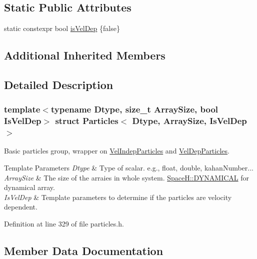 \subsection*{Static Public Attributes}
\begin{DoxyCompactItemize}
\item 
static constexpr bool \mbox{\hyperlink{struct_particles_a2a5da328ea157f7b1c4eddb74eef2e09}{is\+Vel\+Dep}} \{false\}
\end{DoxyCompactItemize}
\subsection*{Additional Inherited Members}


\subsection{Detailed Description}
\subsubsection*{template$<$typename Dtype, size\+\_\+t Array\+Size, bool Is\+Vel\+Dep$>$\newline
struct Particles$<$ Dtype, Array\+Size, Is\+Vel\+Dep $>$}

Basic particles group, wrapper on \mbox{\hyperlink{class_vel_indep_particles}{Vel\+Indep\+Particles}} and \mbox{\hyperlink{class_vel_dep_particles}{Vel\+Dep\+Particles}}. 


\begin{DoxyTemplParams}{Template Parameters}
{\em Dtype} & Type of scalar. e.\+g., float, double, kahan\+Number... \\
\hline
{\em Array\+Size} & The size of the arraies in whole system. \mbox{\hyperlink{namespace_space_h_a3e55b9bc2a9e10c08ce8121bce11244a}{Space\+H\+::\+D\+Y\+N\+A\+M\+I\+C\+AL}} for dynamical array. \\
\hline
{\em Is\+Vel\+Dep} & Template parameters to determine if the particles are velocity dependent. \\
\hline
\end{DoxyTemplParams}


Definition at line 329 of file particles.\+h.



\subsection{Member Data Documentation}
\mbox{\label{struct_particles_a2a5da328ea157f7b1c4eddb74eef2e09}} 

